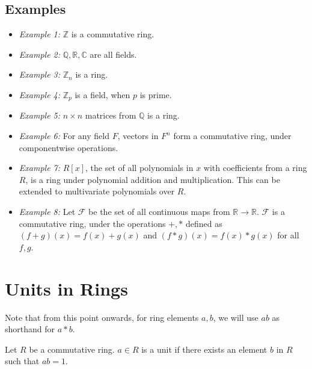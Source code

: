 \subsection{Examples}
\begin{itemize}
  \item \emph{Example 1:} $\mathbb{Z}$ is a commutative ring.
  \item \emph{Example 2:} $\mathbb{Q}, \mathbb{R}, \mathbb{C}$ are all fields.
  \item \emph{Example 3:} $\mathbb{Z}_{n}$ is a ring.
  \item \emph{Example 4:} $\mathbb{Z}_{p}$ is a field, when $p$ is prime.
  \item \emph{Example 5:} $n \times n$ matrices from $\mathbb{Q}$ is a ring.
  \item \emph{Example 6:} For any field $F$, vectors in $F^{n}$ form a commutative ring, under componentwise operations.
  \item \emph{Example 7:} $R[x]$, the set of all polynomials in $x$ with coefficients from a ring $R$, is a ring under polynomial addition and multiplication. This can be extended to multivariate polynomials over $R$.
  \item \emph{Example 8:} Let $\mathcal{F}$ be the set of all continuous maps from $\mathbb{R} \rightarrow \mathbb{R}$.
    $\mathcal{F}$ is a commutative ring, under the operations $+, *$ defined as $(f + g)(x) = f(x) + g(x)$ and $(f * g)(x) = f(x) * g(x)$ for all $f, g$.
\end{itemize}

\section{Units in Rings}
Note that from this point onwards, for ring elements $a, b$, we will use $ab$ as shorthand for $a*b$.
\begin{definition} \label{def:units}
  Let $R$ be a commutative ring.
  $a \in R$ is a unit if there exists an element $b$ in $R$ such that $ab = 1$.
\end{definition}

